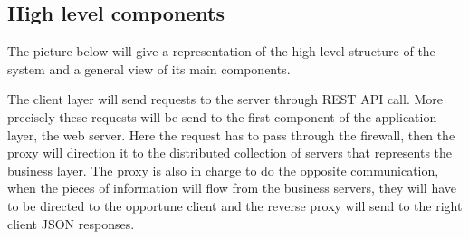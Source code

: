 \subsection{High level components}
The picture below will give a representation of the high-level structure of the system and a general view of its main components.
\begin{center}
\thispagestyle{empty}
\end{center}
The client layer will send requests to the server through REST API call. More precisely these requests will be send to the first component of the application layer, the web server. Here the request has to pass through the firewall, then the proxy will direction it to the distributed collection of servers that represents the business layer. The proxy is also in charge to do the opposite communication, when the pieces of information will flow from the business servers, they will have to be directed to the opportune client and the reverse proxy will send to the right client JSON responses.


\begin{landscape}
\begin{center}
\thispagestyle{empty}
\end{center}
\end{landscape}


